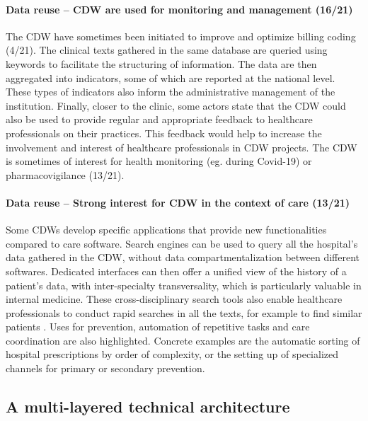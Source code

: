 \documentclass[french,12pt,twoside,a4paper]{book}
\begin{document}
\paragraph{Data reuse -- CDW are used for monitoring and management (16/21)}


The CDW have sometimes been initiated to improve and optimize billing coding
(4/21). The clinical texts gathered in the same database are queried using
keywords to facilitate the structuring of information. The data are then
aggregated into indicators, some of which are reported at the national level.
These types of indicators also inform the administrative management of the
institution. Finally, closer to the clinic, some actors state that the CDW could
also be used to provide regular and appropriate feedback to healthcare
professionals on their practices. This feedback would help to increase the
involvement and interest of healthcare professionals in CDW projects. The CDW is
sometimes of interest for health monitoring (eg. during Covid-19) or
pharmacovigilance (13/21).


\paragraph{Data reuse -- Strong interest for CDW in the context of care (13/21)}

Some CDWs develop specific applications that provide new functionalities
compared to care software. Search engines can be used to query all the
hospital's data gathered in the CDW, without data compartmentalization between
different softwares. Dedicated interfaces can then offer a unified view of the
history of a patient's data, with inter-specialty transversality, which is
particularly valuable in internal medicine. These cross-disciplinary search
tools also enable healthcare professionals to conduct rapid searches in all the
texts, for example to find similar patients \citep{garcelon_finding_2017}. Uses
for prevention, automation of repetitive tasks and care coordination are also
highlighted. Concrete examples are the automatic sorting of hospital
prescriptions by order of complexity, or the setting up of specialized channels
for primary or secondary prevention.
%

\subsection{A multi-layered technical architecture}%
\label{subsec:cdw:results:architecture}%
\end{document}
